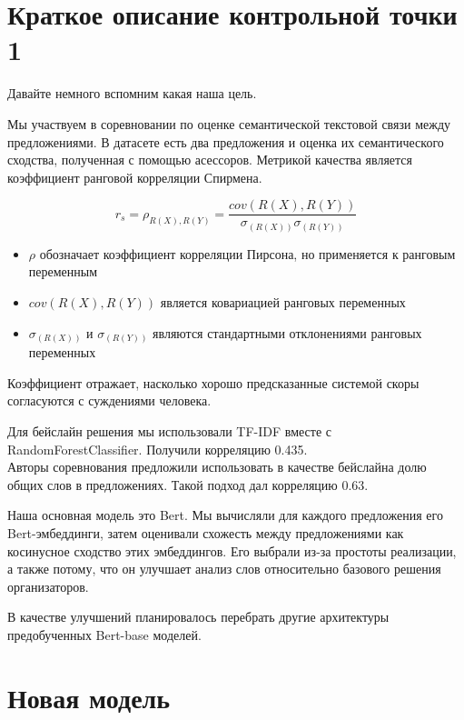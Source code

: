 \documentclass[12pt]{article}
\begin{document}
\tableofcontents
\newpage

\section{Краткое описание контрольной точки 1}

Давайте немного вспомним какая наша цель.

Мы участвуем в соревновании по оценке семантической текстовой связи между предложениями. В датасете есть два предложения и оценка их семантического сходства, полученная с помощью асессоров. Метрикой качества является коэффициент ранговой корреляции Спирмена.

$$
r_s = \rho_{R(X), R(Y)} = \frac{cov(R(X), R(Y))}{\sigma_{(R(X))} \sigma_{(R(Y))}}
$$
\begin{itemize}
    \item $\rho$ обозначает коэффициент корреляции Пирсона, но применяется к ранговым переменным
    \item $cov(R(X), R(Y))$ является ковариацией ранговых переменных
    \item $\sigma_{(R(X))}$ и $\sigma_{(R(Y))}$ являются стандартными отклонениями ранговых переменных
\end{itemize}
Коэффициент отражает, насколько хорошо предсказанные системой скоры согласуются с суждениями человека.

Для бейслайн решения мы использовали TF-IDF вместе с RandomForestClassifier. Получили корреляцию 0.435. \\
Авторы соревнования предложили использовать в качестве бейслайна долю общих слов в предложениях. Такой подход дал корреляцию 0.63.

Наша основная модель это Bert. Мы вычисляли для каждого предложения его Bert-эмбеддинги, затем оценивали схожесть между предложениями как косинусное сходство этих эмбеддингов. Его выбрали из-за простоты реализации, а также потому, что он улучшает анализ слов относительно базового решения организаторов. 

В качестве улучшений планировалось перебрать другие архитектуры предобученных Bert-base моделей.

\newpage

\section{Новая модель}
\end{document}
